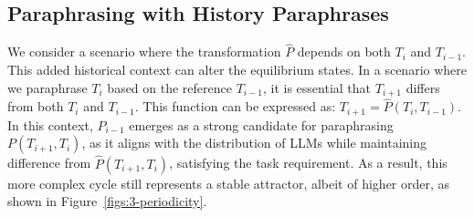 


\subsection{Paraphrasing with History Paraphrases}


We consider a scenario where the transformation $\hat{P}$ depends on both $T_i$ and $T_{i-1}$.
This added historical context can alter the equilibrium states. 
In a scenario where we paraphrase \(T_{i}\) based on the reference \(T_{i-1}\), it is essential that \(T_{i+1}\) differs from both \(T_{i}\) and \(T_{i-1}\). This function can be expressed as: $T_{i+1} = \hat{P}(T_{i}, T_{i-1})$.
In this context, \(P_{i-1}\) emerges as a strong candidate for paraphrasing \(P(T_{i+1}, T_{i})\), as it aligns with the distribution of LLMs while maintaining difference from \(\hat{P}(T_{i+1}, T_{i})\), satisfying the task requirement.
As a result, this more complex cycle still represents a stable attractor, albeit of higher order, as shown in Figure~\ref{figs:3-periodicity}.



